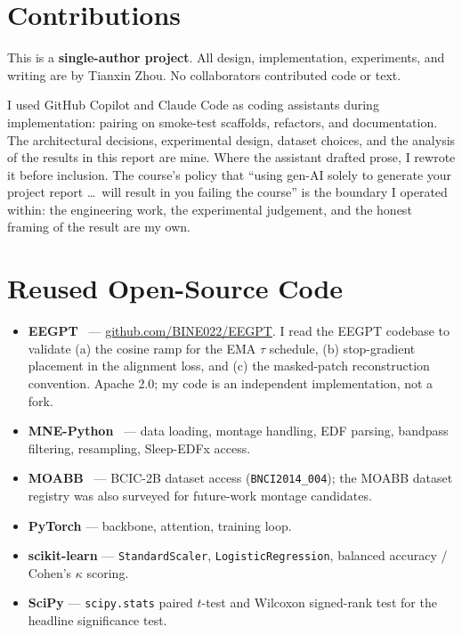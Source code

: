 \documentclass[11pt]{article}
\begin{document}
\section{Contributions}
\label{sec:contributions}

This is a \textbf{single-author project}. All design, implementation,
experiments, and writing are by Tianxin Zhou. No collaborators contributed
code or text.

I used GitHub Copilot and Claude Code as coding assistants during
implementation: pairing on smoke-test scaffolds, refactors, and
documentation. The architectural decisions, experimental design, dataset
choices, and the analysis of the results in this report are mine. Where the
assistant drafted prose, I rewrote it before inclusion. The course's policy
that ``using gen-AI solely to generate your project report \ldots\ will
result in you failing the course'' is the boundary I operated within: the
engineering work, the experimental judgement, and the honest framing of the
result are my own.

\section{Reused Open-Source Code}
\label{sec:reused}

\begin{itemize}[leftmargin=*, itemsep=2pt, topsep=2pt]
  \item \textbf{EEGPT}~\cite{wang2024eegpt} ---
        \href{https://github.com/BINE022/EEGPT}{github.com/BINE022/EEGPT}.
        I read the EEGPT codebase to validate (a) the cosine ramp for the
        EMA $\tau$ schedule, (b) stop-gradient placement in the alignment
        loss, and (c) the masked-patch reconstruction convention. Apache
        2.0; my code is an independent implementation, not a fork.
  \item \textbf{MNE-Python}~\cite{gramfort2013mne} --- data loading,
        montage handling, EDF parsing, bandpass filtering, resampling,
        Sleep-EDFx access.
  \item \textbf{MOABB}~\cite{aristimunha2023moabb} --- BCIC-2B dataset
        access (\texttt{BNCI2014\_004}); the MOABB dataset registry was also
        surveyed for future-work montage candidates.
  \item \textbf{PyTorch} --- backbone, attention, training loop.
  \item \textbf{scikit-learn} --- \texttt{StandardScaler},
        \texttt{LogisticRegression}, balanced accuracy / Cohen's $\kappa$
        scoring.
  \item \textbf{SciPy} --- \texttt{scipy.stats} paired $t$-test and Wilcoxon
        signed-rank test for the headline significance test.
\end{itemize}
\end{document}
